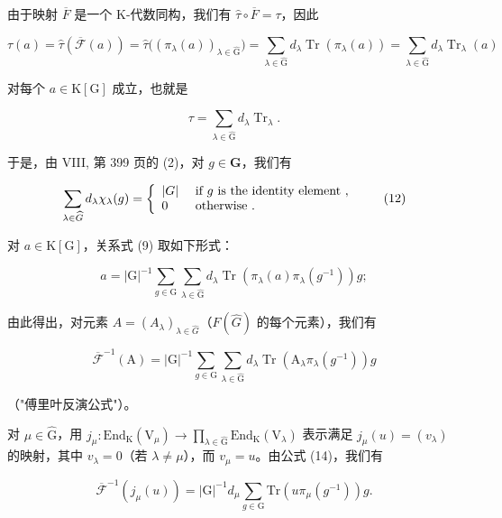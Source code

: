 由于映射 \(\overline{F}\) 是一个 K-代数同构，我们有 \(\widehat{\tau}\circ\overline{F}=\tau\)，因此

\[
\tau (a) = \widehat {\tau} (\overline {{\mathcal {F}}} (a)) = \widehat {\tau} \big ((\pi_ {\lambda} (a)) _ {\lambda \in \widehat {\mathrm{G}}} \big) = \sum_ {\lambda \in \widehat {\mathrm{G}}} d _ {\lambda} \operatorname{Tr} (\pi_ {\lambda} (a)) = \sum_ {\lambda \in \widehat {\mathrm{G}}} d _ {\lambda} \operatorname{Tr} _ {\lambda} (a)
\]

对每个 \(a\in \mathrm{K}[\mathrm{G}]\) 成立，也就是

\[
\tau = \sum_ {\lambda \in \widehat {\mathrm{G}}} d _ {\lambda} \operatorname{Tr} _ {\lambda}.\tag{11}
\]

于是，由 VIII, 第 399 页的 (2)，对 \(g \in \mathbf{G}\)，我们有

\[
\sum_ {\lambda \in \widehat {G}} d _ {\lambda}   \chi_ {\lambda} (g) = \left\{ \begin{array}{l l} | G | & \text { if   } g \text {   is   the   identity   element }, \\ 0 & \text { otherwise }. \end{array} \right.\tag{12}
\]

对 \(a \in \mathrm{K}[\mathrm{G}]\)，关系式 (9) 取如下形式：

\[
a = | \mathrm{G} | ^ {- 1} \sum_ {g \in \mathrm{G}} \sum_ {\lambda \in \widehat {\mathrm{G}}} d _ {\lambda} \left. \operatorname{Tr} (\pi_ {\lambda} (a) \pi_ {\lambda} (g ^ {- 1})) g; \right.\tag{13}
\]

由此得出，对元素 \(A = (A_{\lambda})_{\lambda \in \widehat{G}}\)（\(F(\widehat{G})\) 的每个元素），我们有

\[
\overline {{\mathcal {F}}} ^ {- 1} (\mathrm{A}) = | \mathrm{G} | ^ {- 1} \sum_ {g \in \mathrm{G}} \sum_ {\lambda \in \widehat {\mathrm{G}}} d _ {\lambda} \operatorname{Tr} (\mathrm{A} _ {\lambda} \pi_ {\lambda} (g ^ {- 1})) g\tag{14}
\]

（"傅里叶反演公式"）。

对 \(\mu \in \widehat{\mathrm{G}}\)，用 \(j_{\mu}:\mathrm{End}_{\mathrm{K}}(\mathrm{V}_{\mu})\longrightarrow \prod_{\lambda \in \widehat{\mathrm{G}}} \mathrm{End}_{\mathrm{K}}(\mathrm{V}_{\lambda})\) 表示满足 \(j_{\mu}(u) = (v_{\lambda})\) 的映射，其中 \(v_{\lambda} = 0\)（若 \(\lambda \neq \mu\)），而 \(v_{\mu} = u\)。由公式 (14)，我们有

\[
\overline {{\mathcal {F}}} ^ {- 1} (j _ {\mu} (u)) = | \mathrm{G} | ^ {- 1} d _ {\mu} \sum_ {g \in \mathrm{G}} \mathrm{Tr} (u \pi_ {\mu} (g ^ {- 1})) g.\tag{15}
\]

